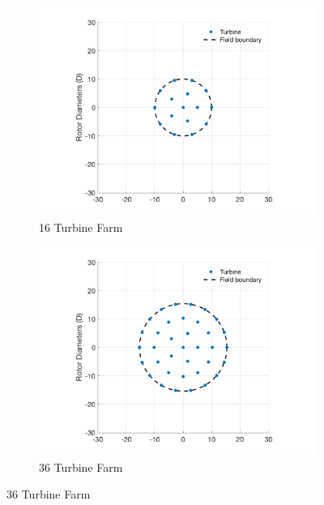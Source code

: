\documentclass[12pt]{article}
\begin{document}
    \begin{figure}[H]
    \centering
        \begin{subfigure}[t]{.49\textwidth}
        \centering
            \includegraphics[width=\linewidth]{BaseCase16.png}
                \caption{16 Turbine Farm} \label{fig:BaseLoc16}
            \end{subfigure}
            \begin{subfigure}[t]{.49\textwidth}
            \centering
            \includegraphics[width=\linewidth]{BaseCase36.png}
            \caption{36 Turbine Farm}\label{fig:BaseLoc36}
            \end{subfigure}
            

\end{figure}
\end{document}
